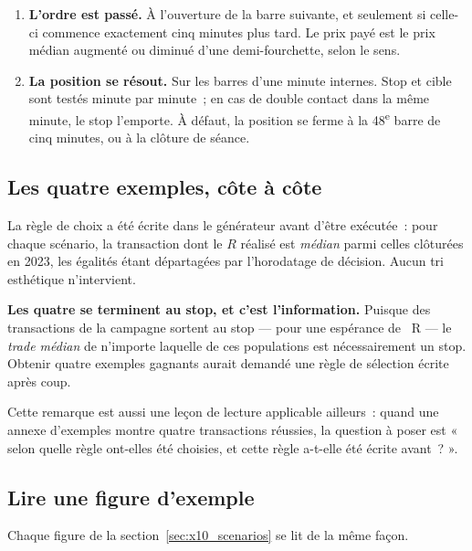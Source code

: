 \begin{enumerate}
  \item \textbf{L'ordre est passé.} À l'ouverture de la barre suivante, et
  seulement si celle-ci commence exactement cinq minutes plus tard. Le prix
  payé est le prix médian augmenté ou diminué d'une demi-fourchette, selon le
  sens.

  \item \textbf{La position se résout.} Sur les barres d'une minute internes.
  Stop et cible sont testés minute par minute~; en cas de double contact dans
  la même minute, le stop l'emporte. À défaut, la position se ferme à la
  48\textsuperscript{e} barre de cinq minutes, ou à la clôture de séance.
\end{enumerate}

\subsection{Les quatre exemples, côte à côte}



La règle de choix a été écrite dans le générateur avant d'être exécutée~: pour
chaque scénario, la transaction dont le $R$ réalisé est \emph{médian} parmi
celles clôturées en 2023, les égalités étant départagées par l'horodatage de
décision. Aucun tri esthétique n'intervient.

\begin{warningbox}
\textbf{Les quatre se terminent au stop, et c'est l'information.} Puisque
\XTenStopShare{} des transactions de la campagne sortent au stop --- pour une
espérance de \XTenStopR{}~R --- le \emph{trade médian} de n'importe laquelle
de ces populations est nécessairement un stop. Obtenir quatre exemples
gagnants aurait demandé une règle de sélection écrite après coup.

Cette remarque est aussi une leçon de lecture applicable ailleurs~: quand une
annexe d'exemples montre quatre transactions réussies, la question à poser est
« selon quelle règle ont-elles été choisies, et cette règle a-t-elle été
écrite avant~? ».
\end{warningbox}

\subsection{Lire une figure d'exemple}

Chaque figure de la section~\ref{sec:x10_scenarios} se lit de la même façon.

